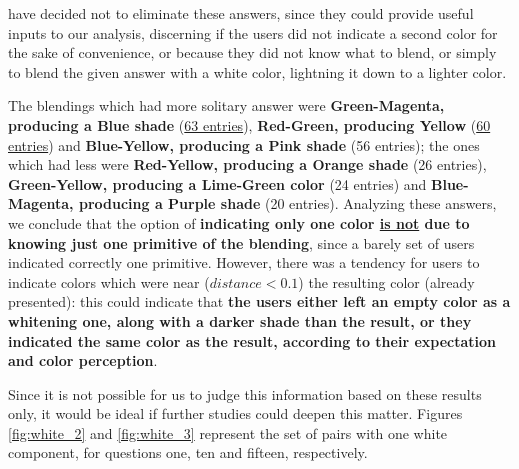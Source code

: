 have decided not to eliminate these answers, since they could provide useful inputs to our analysis, discerning if the users did not indicate a second color for the sake of convenience, or because they did not know what to blend, or simply to blend the given
answer with a white color, lightning it down to a lighter color. \par
%
The blendings which had more solitary answer were \textbf{Green-Magenta, producing a Blue shade} (\ul{63 entries}), \textbf{Red-Green, producing Yellow} (\ul{60 entries}) and
\textbf{Blue-Yellow, producing a Pink shade} (56 entries); the ones which had less were \textbf{Red-Yellow, producing a Orange shade} (26 entries), \textbf{Green-Yellow, producing a Lime-Green color} (24 entries) and \textbf{Blue-Magenta,
producing a Purple shade} (20 entries). Analyzing these answers, we conclude that the option of \textbf{indicating only one color \ul{is not} due to knowing just one primitive of the blending}, since a barely set of users indicated correctly one primitive.
However, there was a tendency for users to indicate colors which were near ($distance < 0.1$) the resulting color (already presented): this could indicate that \textbf{the users either left an empty color as a whitening one, along with a darker shade than the
result, or they indicated the same color as the result, according to their expectation and color perception}. \par
%
Since it is not possible for us to judge this information based on these results only, it would be ideal if further studies could deepen this matter.
Figures \ref{fig:white_2} and \ref{fig:white_3} represent the set of pairs with one white component, for questions one, ten and fifteen, respectively. \par
%
